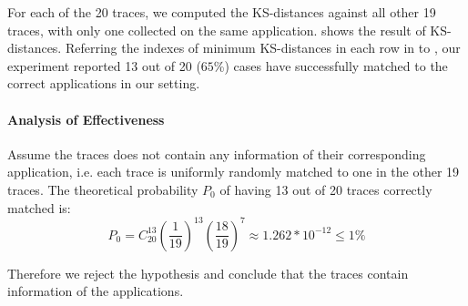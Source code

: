 For each of the 20 traces, we computed the KS-distances against all other 19 traces, with only one collected on the same application.  shows the result of KS-distances. Referring the indexes of minimum KS-distances in each row in  to , our experiment reported 13 out of 20 ($65$\%) cases have successfully matched to the correct applications in our setting.

\paragraph{Analysis of Effectiveness}

Assume the traces does not contain any information of their corresponding application, i.e. each trace is uniformly randomly matched to one in the other 19 traces. The theoretical probability $P_0$ of having 13 out of 20 traces correctly matched is:
\begin{equation*}
P_0 = C^{13}_{20} (\frac{1}{19})^{13} (\frac{18}{19})^{7} \approx 1.262 * 10^{-12} \leq 1\%
\end{equation*}

Therefore we reject the hypothesis and conclude that the traces contain information of the applications.